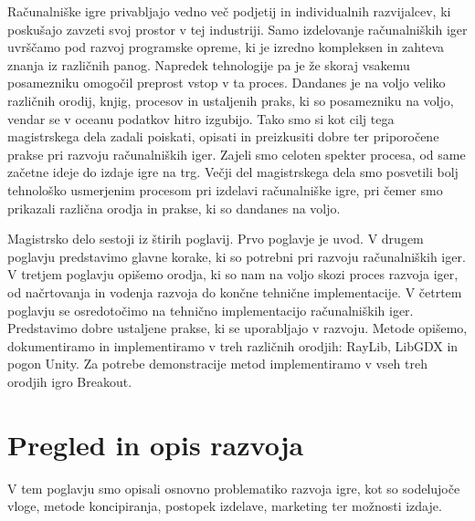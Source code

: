 \documentclass[12pt,a4paper,twoside]{book}
\begin{document}
Računalniške igre privabljajo vedno več podjetij in individualnih razvijalcev, ki poskušajo zavzeti svoj prostor v tej industriji. Samo izdelovanje računalniških iger uvrščamo pod razvoj programske opreme, ki je izredno kompleksen in zahteva znanja iz različnih panog. Napredek tehnologije pa je že skoraj vsakemu posamezniku omogočil preprost vstop v ta proces. Dandanes je na voljo veliko različnih orodij, knjig, procesov in ustaljenih praks, ki so posamezniku na voljo, vendar se v oceanu podatkov hitro izgubijo. Tako smo si kot cilj tega magistrskega dela zadali poiskati, opisati in preizkusiti dobre ter priporočene prakse pri razvoju računalniških iger. Zajeli smo celoten spekter procesa, od same začetne ideje do izdaje igre na trg. Večji del magistrskega dela smo posvetili bolj tehnološko usmerjenim procesom pri izdelavi računalniške igre, pri čemer smo prikazali različna orodja in prakse, ki so dandanes na voljo.

Magistrsko delo sestoji iz štirih poglavij. Prvo poglavje je uvod. V drugem poglavju predstavimo glavne korake, ki so potrebni pri razvoju računalniških iger. V tretjem poglavju opišemo orodja, ki so nam na voljo skozi proces razvoja iger, od načrtovanja in vodenja razvoja do končne tehnične implementacije. V četrtem poglavju se osredotočimo na tehnično implementacijo računalniških iger. Predstavimo dobre ustaljene prakse, ki se uporabljajo v razvoju. Metode opišemo, dokumentiramo in implementiramo v treh različnih orodjih: RayLib, LibGDX in pogon Unity. Za potrebe demonstracije metod implementiramo v vseh treh orodjih igro Breakout.

\chapter{Pregled in opis razvoja}\thispagestyle{fancy}
V tem poglavju smo opisali osnovno problematiko razvoja igre, kot so sodelujoče vloge, metode koncipiranja, postopek izdelave, marketing ter možnosti izdaje.
\end{document}
